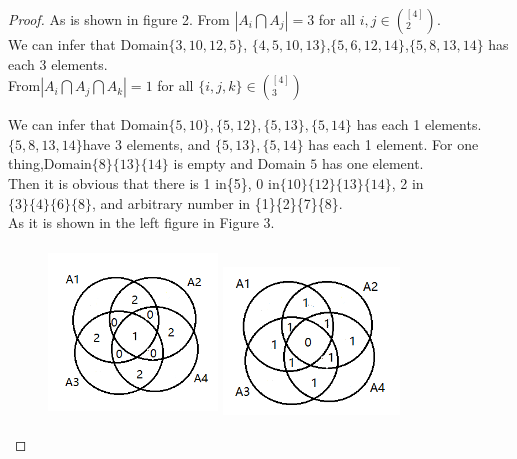 \documentclass[12pt,a4]{article}
\begin{document}
\begin{proof}
    As is shown in figure 2.
    From $|A_i\bigcap A_j| = 3$ for all ${i,j} \in (^{[4]}_{2})$.
    \\We can infer that Domain$\{3,10,12,5\}$,
    $\{4,5,10,13\}$,$\{5,6,12,14\}$,$\{5,8,13,14\}$ has each 3 elements.
    \\From$|A_i\bigcap A_j\bigcap A_k| = 1$ for all $\{i,j,k\}\in (^{[4]}_{3})$

    We can infer that Domain$\{5,10\},\{5,12\},\{5,13\},\{5,14\}$ has each 1 elements.
    $\{5,8,13,14\}$have 3 elements, and $\{5,13\} , \{5,14\}$ has each 1 element.
    For one thing,Domain$\{8\}\{13\}\{14\}$ is empty and Domain ${5}$ has one element.
    \\Then it is obvious that there is 1 in\{5\}, 0 in$\{10\}\{12\}\{13\}\{14\}$, 2 in $\{3\}\{4\}\{6\}\{8\}$, and arbitrary number in \{1\}\{2\}\{7\}\{8\}.
    \\As it is shown in the left figure in Figure 3.\\


    \begin{figure}[H]
    \centering
    \begin{minipage}[c]{0.5\textwidth}
    \centering
    \includegraphics[height=4.5cm,width=4.5cm]{Exercise31-2.png}
    \end{minipage}%
    \begin{minipage}[c]{0.5\textwidth}
    \centering
    \includegraphics[height=4.0cm,width=4.7cm]{Exercise31-3.png}
    \end{minipage}
    \caption{}
    \end{figure}




\end{proof}
\end{document}
